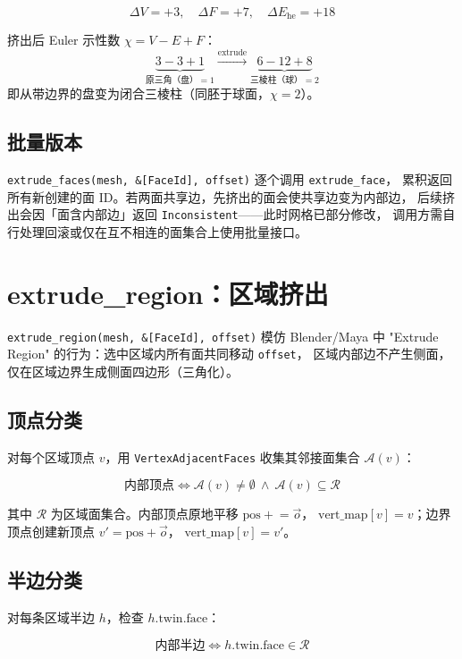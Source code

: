 \documentclass[11pt,a4paper]{article}
\begin{document}
\[
  \Delta V = +3, \quad \Delta F = +7, \quad \Delta E_{\mathrm{he}} = +18
\]

挤出后 Euler 示性数 $\chi = V - E + F$：
\[
  \underbrace{3 - 3 + 1}_{\text{原三角（盘）}= 1}
  \xrightarrow{\text{extrude}}
  \underbrace{6 - 12 + 8}_{\text{三棱柱（球）}= 2}
\]
即从带边界的盘变为闭合三棱柱（同胚于球面，$\chi = 2$）。

\subsection{批量版本}

\texttt{extrude\_faces(mesh, \&[FaceId], offset)} 逐个调用 \texttt{extrude\_face}，
累积返回所有新创建的面 ID。若两面共享边，先挤出的面会使共享边变为内部边，
后续挤出会因「面含内部边」返回 \texttt{Inconsistent}——此时网格已部分修改，
调用方需自行处理回滚或仅在互不相连的面集合上使用批量接口。

\section{extrude\_region：区域挤出}
\label{sec:extrude-region}

\texttt{extrude\_region(mesh, \&[FaceId], offset)} 模仿 Blender/Maya 中
"Extrude Region" 的行为：选中区域内所有面共同移动 \texttt{offset}，
区域内部边不产生侧面，仅在区域边界生成侧面四边形（三角化）。

\subsection{顶点分类}

对每个区域顶点 $v$，用 \texttt{VertexAdjacentFaces} 收集其邻接面集合 $\mathcal{A}(v)$：

\[
  \text{内部顶点} \iff \mathcal{A}(v) \neq \emptyset \ \wedge\ \mathcal{A}(v) \subseteq \mathcal{R}
\]

其中 $\mathcal{R}$ 为区域面集合。内部顶点原地平移 $\text{pos} \mathrel{+}= \vec{o}$，
$\text{vert\_map}[v] = v$；边界顶点创建新顶点 $v' = \text{pos} + \vec{o}$，
$\text{vert\_map}[v] = v'$。

\subsection{半边分类}

对每条区域半边 $h$，检查 $h.\text{twin}.\text{face}$：

\[
  \text{内部半边} \iff h.\text{twin}.\text{face} \in \mathcal{R}
\]
\end{document}

